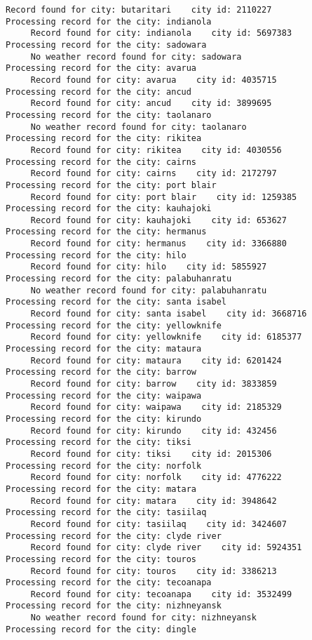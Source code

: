 \documentclass[11pt]{article}
\begin{document}
\begin{Verbatim}[commandchars=\\\{\}]
     Record found for city: butaritari    city id: 2110227
Processing record for the city: indianola
     Record found for city: indianola    city id: 5697383
Processing record for the city: sadowara
     No weather record found for city: sadowara
Processing record for the city: avarua
     Record found for city: avarua    city id: 4035715
Processing record for the city: ancud
     Record found for city: ancud    city id: 3899695
Processing record for the city: taolanaro
     No weather record found for city: taolanaro
Processing record for the city: rikitea
     Record found for city: rikitea    city id: 4030556
Processing record for the city: cairns
     Record found for city: cairns    city id: 2172797
Processing record for the city: port blair
     Record found for city: port blair    city id: 1259385
Processing record for the city: kauhajoki
     Record found for city: kauhajoki    city id: 653627
Processing record for the city: hermanus
     Record found for city: hermanus    city id: 3366880
Processing record for the city: hilo
     Record found for city: hilo    city id: 5855927
Processing record for the city: palabuhanratu
     No weather record found for city: palabuhanratu
Processing record for the city: santa isabel
     Record found for city: santa isabel    city id: 3668716
Processing record for the city: yellowknife
     Record found for city: yellowknife    city id: 6185377
Processing record for the city: mataura
     Record found for city: mataura    city id: 6201424
Processing record for the city: barrow
     Record found for city: barrow    city id: 3833859
Processing record for the city: waipawa
     Record found for city: waipawa    city id: 2185329
Processing record for the city: kirundo
     Record found for city: kirundo    city id: 432456
Processing record for the city: tiksi
     Record found for city: tiksi    city id: 2015306
Processing record for the city: norfolk
     Record found for city: norfolk    city id: 4776222
Processing record for the city: matara
     Record found for city: matara    city id: 3948642
Processing record for the city: tasiilaq
     Record found for city: tasiilaq    city id: 3424607
Processing record for the city: clyde river
     Record found for city: clyde river    city id: 5924351
Processing record for the city: touros
     Record found for city: touros    city id: 3386213
Processing record for the city: tecoanapa
     Record found for city: tecoanapa    city id: 3532499
Processing record for the city: nizhneyansk
     No weather record found for city: nizhneyansk
Processing record for the city: dingle

\end{Verbatim}
\end{document}
